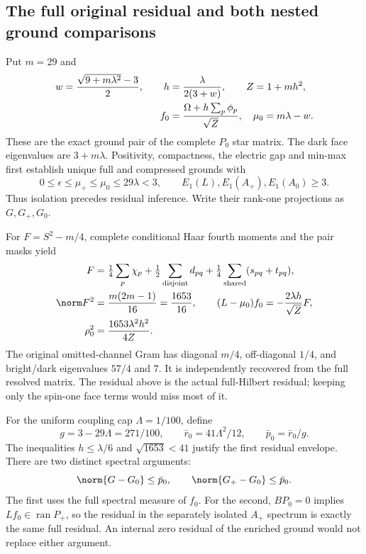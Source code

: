 \subsection{The full original residual and both nested ground comparisons}
Put $m=29$ and
\begin{align}
 w=\frac{\sqrt{9+m\lambda^2}-3}{2},\qquad
 h&=\frac{\lambda}{2(3+w)},\qquad Z=1+mh^2,\notag\\
 f_0&=\frac{\Omega+h\sum_p\phi_p}{\sqrt Z},
 \quad\mu_0=m\lambda-w.
 \label{r28:eq:ah1-ritz}
\end{align}
These are the exact ground pair of the complete $P_0$ star matrix. The dark face eigenvalues are $3+m\lambda$. Positivity, compactness, the electric gap and min-max first establish unique full and compressed grounds with
\begin{equation}
 0\le\epsilon\le\mu_+\le\mu_0\le29\lambda<3,
 \qquad E_1(L),E_1(A_+),E_1(A_0)\ge3.
 \label{r28:eq:ah1-isolation}
\end{equation}
Thus isolation precedes residual inference. Write their rank-one projections as $G,G_+,G_0$.

For $F=S^2-m/4$, complete conditional Haar fourth moments and the pair masks yield
\begin{align}
 F&=\tfrac14\sum_p\chi_p+\tfrac12\sum_{\rm disjoint}d_{pq}
    +\tfrac14\sum_{\rm shared}(s_{pq}+t_{pq}),\notag\\
 \norm F^2&=\frac{m(2m-1)}{16}=\frac{1653}{16},\qquad
 (L-\mu_0)f_0=-\frac{2\lambda h}{\sqrt Z}F,\notag\\
 \rho_0^2&=\frac{1653\lambda^2h^2}{4Z}.
 \label{r28:eq:ah1-full-residual}
\end{align}
The original omitted-channel Gram has diagonal $m/4$, off-diagonal $1/4$, and bright/dark eigenvalues $57/4$ and $7$. It is independently recovered from the full resolved matrix. The residual above is the actual full-Hilbert residual; keeping only the spin-one face terms would miss most of it.

For the uniform coupling cap $\Lambda=1/100$, define
\begin{equation}
 g=3-29\Lambda=271/100,
 \qquad\bar r_0=41\Lambda^2/12,
 \qquad\bar p_0=\bar r_0/g.
\end{equation}
The inequalities $h\le\lambda/6$ and $\sqrt{1653}<41$ justify the first residual envelope. There are two distinct spectral arguments:
\begin{equation}
 \norm{G-G_0}\le\bar p_0,
 \qquad\norm{G_+-G_0}\le\bar p_0.
 \label{r28:eq:ah1-two-p0}
\end{equation}
The first uses the full spectral measure of $f_0$. For the second, $BP_0=0$ implies $Lf_0\in\operatorname{ran}P_+$, so the residual in the separately isolated $A_+$ spectrum is exactly the same full residual. An internal zero residual of the enriched ground would not replace either argument.

